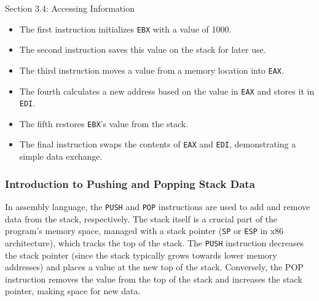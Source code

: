 \begin{notes}{Section 3.4: Accessing Information}
\begin{highlight}
        \begin{itemize}
            \item The first instruction initializes \texttt{EBX} with a value of 1000.
            \item The second instruction saves this value on the stack for later use.
            \item The third instruction moves a value from a memory location into \texttt{EAX}.
            \item The fourth calculates a new address based on the value in \texttt{EAX} and stores it in \texttt{EDI}.
            \item The fifth restores \texttt{EBX}'s value from the stack.
            \item The final instruction swaps the contents of \texttt{EAX} and \texttt{EDI}, demonstrating a simple data exchange.
        \end{itemize}
    \end{highlight}

    \subsubsection*{Introduction to Pushing and Popping Stack Data}

    In assembly language, the \texttt{PUSH} and \texttt{POP} instructions are used to add and remove data from the stack, respectively. The stack itself is a crucial part of the program's memory space, 
    managed with a stack pointer (\texttt{SP} or \texttt{ESP} in x86 architecture), which tracks the top of the stack. The \texttt{PUSH} instruction decreases the stack pointer (since the stack typically 
    grows towards lower memory addresses) and places a value at the new top of the stack. Conversely, the POP instruction removes the value from the top of the stack and increases the stack pointer, 
    making space for new data.


\end{notes}
